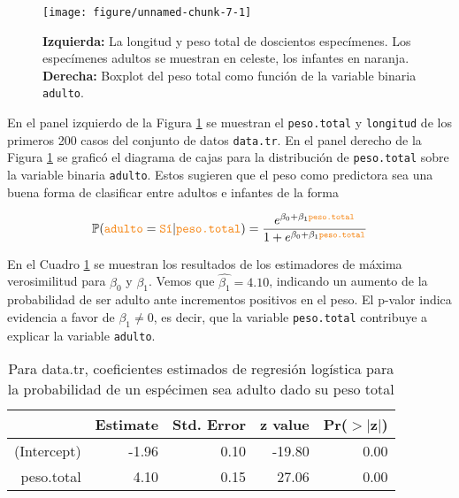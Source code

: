 \documentclass[a4paper]{article}\usepackage[]{graphicx}\usepackage[]{color}
\makeatletter
\def\maxwidth{ %
  \ifdim\Gin@nat@width>\linewidth
    \linewidth
  \else
    \Gin@nat@width
  \fi
}
\newenvironment{knitrout}{}{} %
\makeatother
\begin{document}
\begin{figure}[t]
\begin{knitrout}
\color{fgcolor}

{\centering \texttt{[image: figure/unnamed-chunk-7-1]} 

}



\end{knitrout}
\caption{\textbf{Izquierda:} La longitud y peso total de doscientos especímenes. Los especímenes adultos se muestran en celeste, los infantes en naranja. \textbf{Derecha:} Boxplot del peso total como función de la variable binaria \texttt{\textcolor{BurntOrange}{adulto}}.}
\label{fig:data2}
\end{figure}

En el panel izquierdo de la Figura \ref{fig:data2} se muestran el \texttt{\textcolor{BurntOrange}{peso.total}} y \texttt{\textcolor{BurntOrange}{longitud}} de los primeros 200 casos del conjunto de datos \texttt{\textcolor{BurntOrange}{data.tr}}. En el panel derecho de la Figura \ref{fig:data2} se graficó el diagrama de cajas para la distribución de \texttt{\textcolor{BurntOrange}{peso.total}} sobre la variable binaria \texttt{\textcolor{BurntOrange}{adulto}}. Estos sugieren que el peso como predictora sea una buena forma de clasificar entre adultos e infantes de la forma


\begin{equation}
\mathbb P(\texttt{\textcolor{BurntOrange}{adulto}} = \texttt{\textcolor{BurntOrange}{Sí}} | \texttt{\textcolor{BurntOrange}{peso.total}}) = \frac{e^{\beta_0 + \beta_1\texttt{\textcolor{BurntOrange}{peso.total}}}}{1+e^{\beta_0 + \beta_1\texttt{\textcolor{BurntOrange}{peso.total}}}}
\end{equation}

En el Cuadro \ref{tab:model2} se muestran los resultados de los estimadores de máxima verosimilitud para $\beta_0$ y $\beta_1$. Vemos que $\hat{\beta_1}=4.10$, indicando un aumento de la probabilidad de ser adulto ante incrementos positivos en el peso. El p-valor indica evidencia a favor de $\beta_1 \neq 0$, es decir, que la variable \texttt{\textcolor{BurntOrange}{peso.total}} contribuye a explicar la variable \texttt{\textcolor{BurntOrange}{adulto}}.

\begin{table}[ht]
\centering
\begin{tabular}{rrrrr}
  \hline
 & Estimate & Std. Error & z value & Pr($>$$|$z$|$) \\ 
  \hline
(Intercept) & -1.96 & 0.10 & -19.80 & 0.00 \\ 
  peso.total & 4.10 & 0.15 & 27.06 & 0.00 \\ 
   \hline
\end{tabular}
\caption{Para data.tr, coeficientes estimados de regresión logística para la probabilidad de un espécimen sea adulto dado su peso total} 
\label{tab:model2}
\end{table}
\end{document}
